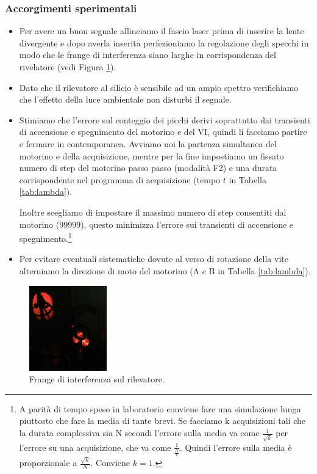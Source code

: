 \documentclass[a4paper]{article}
\begin{document}
\subsubsection{Accorgimenti sperimentali}
\begin{itemize}
	\item Per avere un buon segnale allineiamo il fascio laser prima di inserire la lente divergente e dopo averla inserita perfezioniamo la regolazione degli specchi in modo che le frange di interferenza siano larghe in corrispondenza del rivelatore (vedi Figura \ref{fig:frange}).
	\item Dato che il rilevatore al silicio è sensibile ad un ampio spettro verifichiamo che l'effetto della luce ambientale non disturbi il segnale.
	\item Stimiamo che l'errore sul conteggio dei picchi derivi soprattutto dai transienti di accensione e spegnimento del motorino e del VI, quindi li facciamo partire e fermare in contemporanea. Avviamo noi la partenza simultanea del motorino e della acquisizione, mentre per la fine impostiamo un fissato numero di step del motorino passo passo (modalità F2) e una durata corrispondente nel programma di acquisizione (tempo $t$ in Tabella \ref{tab:lambda}).
	
	Inoltre scegliamo di impostare il massimo numero di step consentiti dal motorino (99999), questo minimizza l'errore sui transienti di accensione e spegnimento.\footnote{A parità di tempo speso in laboratorio conviene fare una simulazione lunga piuttosto che fare la media di tante brevi. Se facciamo k acquisizioni tali che la durata complessiva sia N secondi l'errore sulla media va come $\frac{1}{\sqrt{k}}$ per l'errore su una acquisizione, che va come $\frac{1}{\frac{N}{k}}$. Quindi l'errore sulla media è proporzionale a $\frac{\sqrt{k}}{N}$. Conviene $k=1$.}
	\item Per evitare eventuali sistematiche dovute al verso di rotazione della vite alterniamo la direzione di moto del motorino (A e B in Tabella \ref{tab:lambda}).
\end{itemize}

\begin{figure}[H]
	\includegraphics[width=0.3\textwidth]{frange.jpg}
	\caption{Frange di interferenza sul rilevatore.}
	\label{fig:frange}
\end{figure}
\end{document}
